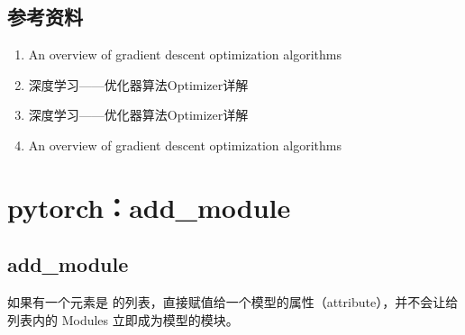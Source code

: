 \documentclass[letterpaper,10pt,english]{sphinxmanual}
\begin{document}
\subsection{参考资料}
\label{\detokenize{deepLearning/08_optimizer:id3}}\begin{enumerate}
\item {} 
An overview of gradient descent optimization algorithms

\end{enumerate}
\begin{quote}

\end{quote}
\begin{enumerate}
\setcounter{enumi}{1}
\item {} 
深度学习——优化器算法Optimizer详解

\end{enumerate}
\begin{quote}

\end{quote}
\begin{enumerate}
\setcounter{enumi}{2}
\item {} 
深度学习——优化器算法Optimizer详解

\end{enumerate}
\begin{quote}

\end{quote}
\begin{enumerate}
\setcounter{enumi}{3}
\item {} 
An overview of gradient descent optimization algorithms

\end{enumerate}
\begin{quote}

\end{quote}


\section{pytorch：add\_module}
\label{\detokenize{deepLearning/09_addModule:pytorch-add-module}}\label{\detokenize{deepLearning/09_addModule::doc}}

\subsection{add\_module}
\label{\detokenize{deepLearning/09_addModule:add-module}}
如果有一个元素是  的列表，直接赋值给一个模型的属性（attribute），并不会让给列表内的 Modules 立即成为模型的模块。
\end{document}
